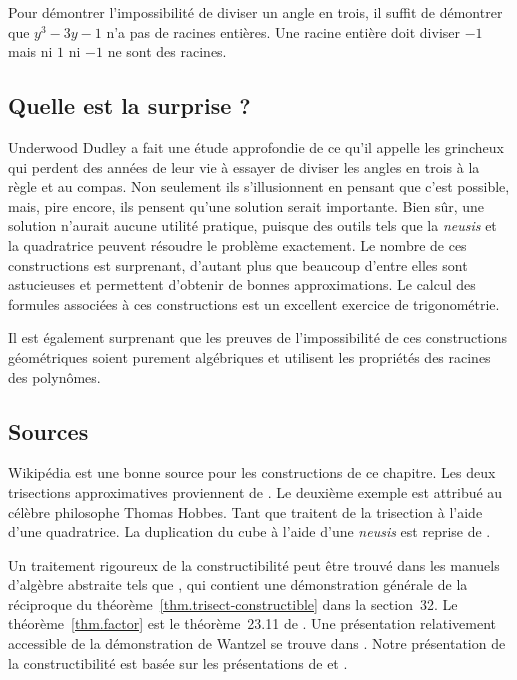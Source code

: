 Pour démontrer l'impossibilité de diviser un angle en trois, il suffit de démontrer que $y^3-3y-1$ n'a pas de racines entières. Une racine entière doit diviser $-1$ mais ni $1$ ni $-1$ ne sont des racines.

\subsection*{Quelle est la surprise ?}

Underwood Dudley a fait une étude approfondie de ce qu'il appelle les \og grincheux\fg{} qui perdent des années de leur vie à essayer de diviser les angles en trois à la règle et au compas. Non seulement ils s'illusionnent en pensant que c'est possible, mais, pire encore, ils pensent qu'une solution serait importante. Bien sûr, une solution n'aurait aucune utilité pratique, puisque des outils tels que la \emph{neusis} et la quadratrice peuvent résoudre le problème exactement. Le nombre de ces constructions est surprenant, d'autant plus que beaucoup d'entre elles sont astucieuses et permettent d'obtenir de bonnes approximations. Le calcul des formules associées à ces constructions est un excellent exercice de trigonométrie.

Il est également surprenant que les preuves de l'impossibilité de ces constructions géométriques soient purement algébriques et utilisent les propriétés des racines des polynômes.

\subsection*{Sources}

Wikipédia \cite{wiki:tri, wiki:neu, wiki:quad} est une bonne source pour les constructions de ce chapitre.
Les deux trisections approximatives proviennent de \cite [p.
~67--68, 95--96]{dudley-budget}. Le deuxième exemple est attribué au célèbre philosophe Thomas Hobbes. Tant \cite[p.~48--49]{martin} que \cite[p.~6--7]{dudley-budget} traitent de la trisection à l'aide d'une quadratrice.
La duplication du cube à l'aide d'une \emph{neusis} est reprise de \cite{dorrie2}.

Un traitement rigoureux de la constructibilité peut être trouvé dans les manuels d'algèbre abstraite tels que \cite{fraleigh}, qui contient une démonstration générale de la réciproque du théorème~\ref{thm.trisect-constructible} dans la section~32.
Le théorème~\ref{thm.factor} est 
 le théorème~23.11 de \cite{fraleigh}.
Une présentation relativement accessible de la démonstration de Wantzel se trouve dans \cite{suzuki}. Notre présentation de la constructibilité est basée sur les présentations de \cite[chap.~III]{courant} et \cite{laugwitz}.
